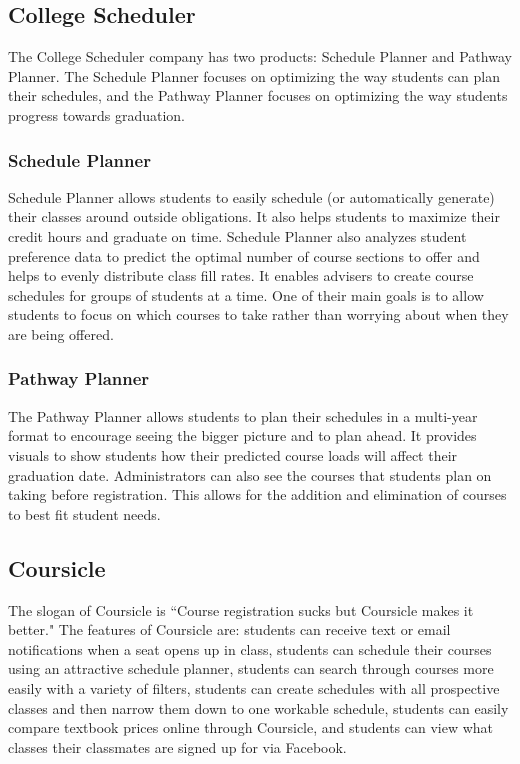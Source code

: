\subsection{College Scheduler}
The College Scheduler company has two products: Schedule Planner and Pathway Planner. The Schedule Planner focuses on optimizing the way students can plan their schedules, and the Pathway Planner focuses on optimizing the way students progress towards graduation.
\subsubsection{Schedule Planner}
Schedule Planner allows students to easily schedule (or automatically generate) their classes around outside obligations. It also helps students to maximize their credit hours and graduate on time. Schedule Planner also analyzes student preference data to predict the optimal number of course sections to offer and helps to evenly distribute class fill rates. It enables advisers to create course schedules for groups of students at a time. One of their main  goals is to allow students to focus on which courses to take rather than worrying about when they are being offered.
\subsubsection{Pathway Planner}
The Pathway Planner allows students to plan their schedules in a multi-year format to encourage seeing the bigger picture and to plan ahead. It provides visuals to show students how their predicted course loads will affect their graduation date. Administrators can also see the courses that students plan on taking before registration. This allows for the addition and elimination of courses to best fit student needs. 

\subsection{Coursicle}
The slogan of Coursicle is ``Course registration sucks but Coursicle makes it better." The features of Coursicle are: students can receive text or email notifications when a seat opens up in class, students can schedule their courses using an attractive schedule planner, students can search through courses more easily with a variety of filters, students can create schedules with all prospective classes and then narrow them down to one workable schedule, students can easily compare textbook prices online through Coursicle, and students can view what classes their classmates are signed up for via Facebook. 

